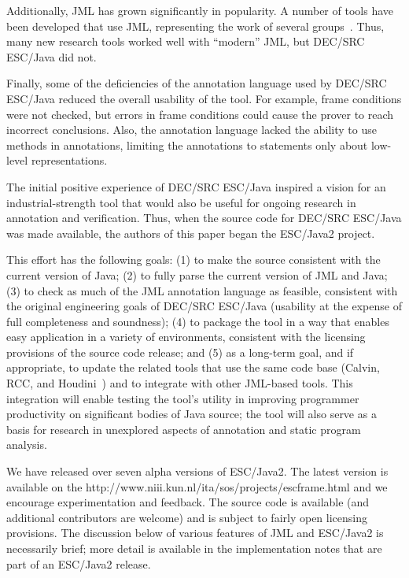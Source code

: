 \documentclass{llncs}
\begin{document}
Additionally, JML has grown significantly in popularity.  A number of
tools have been developed that use JML, representing the work of
several
groups~\cite{jmlpapers,Burdy-etal03,Leavens-etal00,NimmerErnst01,Bogor03}.
Thus, many new research tools worked well with ``modern'' JML, but
DEC/SRC ESC/Java did not.

Finally, some of the deficiencies of the annotation language used by
DEC/SRC ESC/Java reduced the overall usability of the tool.  For
example, frame conditions were not checked, but errors in frame
conditions could cause the prover to reach incorrect conclusions.
Also, the annotation language lacked the ability to use methods in
annotations, limiting the annotations to statements only about
low-level representations.

The initial positive experience of DEC/SRC ESC/Java inspired a vision
for an industrial-strength tool that would also be useful for ongoing
research in annotation and verification.  Thus, when the source code
for DEC/SRC ESC/Java was made available, the authors of this paper
began the ESC/Java2 project.

This effort has the following goals:
(1) to make the source consistent with the current version of Java;
(2) to fully parse the current version of JML and Java;
(3) to check as much of the JML annotation language as feasible,
consistent with the original engineering goals of DEC/SRC ESC/Java
(usability at the expense of full completeness and soundness);
(4) to package the tool in a way that enables easy application in a
variety of environments, consistent with the licensing provisions of
the source code release; and
(5) as a long-term goal, and if appropriate, to update the related
tools that use the same code base (Calvin, RCC, and
Houdini~\cite{flanagan01houdini}) and to integrate with other
JML-based tools.  This integration will enable testing the tool's
utility in improving programmer productivity on significant bodies of
Java source; the tool will also serve as a basis for research in
unexplored aspects of annotation and static program analysis.
  
We have released over seven alpha versions of ESC/Java2.  The latest
version is available on the 
{http://www.niii.kun.nl/ita/sos/projects/escframe.html} and we
encourage experimentation and feedback.  The source code is available
(and additional contributors are welcome) and is subject to fairly
open licensing provisions.  The discussion below of various features
of JML and ESC/Java2 is necessarily brief; more detail is available in
the implementation notes that are part of an ESC/Java2 release.
\end{document}
